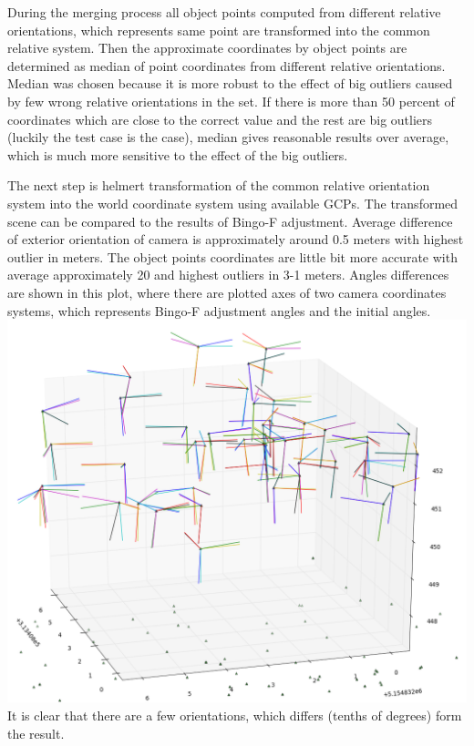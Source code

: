 \documentclass[a4paper,12pt]{article}
\begin{document}
During the merging process all object points computed from different relative orientations, which represents same point are 
transformed into  the common relative system. Then the approximate coordinates by object points are determined as median
of point coordinates from different relative orientations. Median was chosen because it is more robust to the effect of 
big outliers caused by few wrong relative orientations in the set. If there is more than 50 percent of coordinates 
which are close to the correct value and the rest are big outliers (luckily the test case is the case), median gives reasonable results over average,
which is much more sensitive to the effect of the big outliers. 

The next step is helmert transformation of the common relative orientation system into the world coordinate system using available GCPs. 
The transformed scene can be compared to the results of Bingo-F adjustment. Average difference of exterior orientation 
of camera is approximately around 0.5 meters with highest outlier in meters. The object points coordinates 
are little bit more accurate with average approximately 20 and highest outliers in 3-1 meters. 
Angles differences are shown in this plot, where there are plotted axes of two camera coordinates systems, which represents 
Bingo-F adjustment angles and the  initial angles. 
\includegraphics[scale=0.4]{figures/angles_comaprison_relative_orinetaion.png}
It is clear that there are a few orientations, which differs  (tenths of degrees) form the result. 
\end{document}
